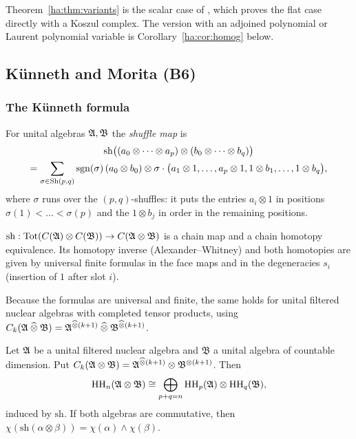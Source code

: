 Theorem~\ref{ha:thm:variants} is the scalar case of \cite[Lemma
``Continuous HKR for the coefficient kernels'']{HHb}, which proves the flat
case directly with a Koszul complex. The version with an adjoined
polynomial or Laurent polynomial variable is
Corollary~\ref{ha:cor:homog} below.

\subsection{Künneth and Morita (B6)}\label{ha:subsec:B6}

\subsubsection*{The Künneth formula}
For unital algebras \(\mathfrak A,\mathfrak B\) the \emph{shuffle map} is
\begin{multline*}
 \mathrm{sh}\bigl((a_0\otimes\dots\otimes a_p)\otimes(b_0\otimes\dots
 \otimes b_q)\bigr)\\
 =\sum_{\sigma\in\operatorname{Sh}(p,q)}\operatorname{sgn}(\sigma)\,(a_0\otimes b_0)
 \otimes\sigma\cdot\bigl(a_1\otimes1,\dots,a_p\otimes1,1\otimes b_1,\dots,
 1\otimes b_q\bigr),
\end{multline*}
where \(\sigma\) runs over the \((p,q)\)-shuffles: it puts the entries
\(a_i\otimes1\) in positions \(\sigma(1)<\dots<\sigma(p)\) and the
\(1\otimes b_j\) in order in the remaining positions.

\begin{background}
\label{ha:bg:EZ}
\(\mathrm{sh}:\operatorname{Tot}(C(\mathfrak A)\otimes C(\mathfrak B))\to
C(\mathfrak A\otimes\mathfrak B)\) is a chain map and a chain homotopy
equivalence. Its homotopy inverse (Alexander--Whitney) and both homotopies
are given by universal finite formulas in the face maps and in the
degeneracies \(s_i\) (insertion of \(1\) after slot \(i\)).
\end{background}

Because the formulas are universal and finite, the same holds for unital
filtered nuclear algebras with completed tensor products, using
\(C_k(\mathfrak A\mathbin{\widehat\otimes}\mathfrak B)=\mathfrak A^{\mathbin{\widehat\otimes}(k+1)}\mathbin{\widehat\otimes}\mathfrak B^{\mathbin{\widehat\otimes}(k+1)}\).

\begin{proposition}[Künneth, (B6)]\label{ha:prop:kunneth}
Let \(\mathfrak A\) be a unital filtered nuclear algebra and \(\mathfrak B\) a
unital algebra of countable dimension. Put \(C_k(\mathfrak A\otimes\mathfrak B)=
\mathfrak A^{\mathbin{\widehat\otimes}(k+1)}\otimes\mathfrak B^{\otimes(k+1)}\). Then
\[
 \operatorname{HH}_n(\mathfrak A\otimes\mathfrak B)\cong\bigoplus_{p+q=n}\operatorname{HH}_p(\mathfrak A)\otimes
 \operatorname{HH}_q(\mathfrak B),
\]
induced by \(\mathrm{sh}\). If both algebras are commutative, then
\(\chi(\mathrm{sh}(\alpha\otimes\beta))=\chi(\alpha)\wedge\chi(\beta)\).
\end{proposition}

